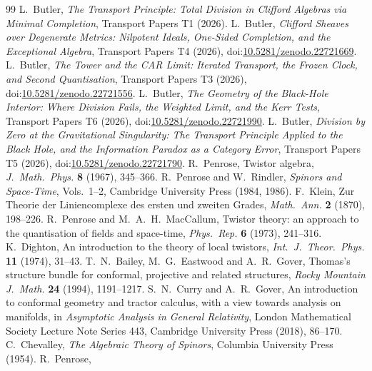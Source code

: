 \documentclass[11pt]{article}
\theoremstyle{definition}
\theoremstyle{plain}
\begin{document}
\begin{thebibliography}{99}
 L.~Butler,
\emph{The Transport Principle: Total Division in Clifford Algebras via Minimal Completion},
Transport Papers T1 (2026).
 L.~Butler,
\emph{Clifford Sheaves over Degenerate Metrics: Nilpotent Ideals, One-Sided Completion, and the Exceptional Algebra},
Transport Papers T4 (2026), doi:\href{https://doi.org/10.5281/zenodo.22721669}{10.5281/zenodo.22721669}.
 L.~Butler,
\emph{The Tower and the CAR Limit: Iterated Transport, the Frozen Clock, and Second Quantisation},
Transport Papers T3 (2026), doi:\href{https://doi.org/10.5281/zenodo.22721556}{10.5281/zenodo.22721556}.
 L.~Butler,
\emph{The Geometry of the Black-Hole Interior: Where Division Fails, the Weighted Limit, and the Kerr Tests},
Transport Papers T6 (2026), doi:\href{https://doi.org/10.5281/zenodo.22721990}{10.5281/zenodo.22721990}.
 L.~Butler,
\emph{Division by Zero at the Gravitational Singularity: The Transport Principle Applied to the Black Hole, and the Information Paradox as a Category Error},
Transport Papers T5 (2026), doi:\href{https://doi.org/10.5281/zenodo.22721790}{10.5281/zenodo.22721790}.
 R.~Penrose,
Twistor algebra,
\emph{J.\ Math.\ Phys.} \textbf{8} (1967), 345--366.
 R.~Penrose and W.~Rindler,
\emph{Spinors and Space-Time}, Vols.~1--2,
Cambridge University Press (1984, 1986).
 F.~Klein,
Zur Theorie der Liniencomplexe des ersten und zweiten Grades,
\emph{Math.\ Ann.} \textbf{2} (1870), 198--226.
 R.~Penrose and M.~A.~H.~MacCallum,
Twistor theory: an approach to the quantisation of fields and space-time,
\emph{Phys.\ Rep.} \textbf{6} (1973), 241--316.
 K.~Dighton,
An introduction to the theory of local twistors,
\emph{Int.\ J.\ Theor.\ Phys.} \textbf{11} (1974), 31--43.
 T.~N.~Bailey, M.~G.~Eastwood and A.~R.~Gover,
Thomas's structure bundle for conformal, projective and related structures,
\emph{Rocky Mountain J.\ Math.} \textbf{24} (1994), 1191--1217.
 S.~N.~Curry and A.~R.~Gover,
An introduction to conformal geometry and tractor calculus, with a view towards analysis on manifolds,
in \emph{Asymptotic Analysis in General Relativity},
London Mathematical Society Lecture Note Series 443, Cambridge University Press (2018), 86--170.
 C.~Chevalley,
\emph{The Algebraic Theory of Spinors},
Columbia University Press (1954).
 R.~Penrose,

\end{thebibliography}
\end{document}
